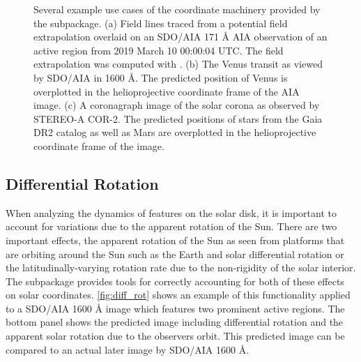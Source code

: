 \begin{figure}
    \caption{Several example use cases of the coordinate machinery provided by the  subpackage.
    (a) Field lines traced from a potential field extrapolation overlaid on an SDO/AIA 171 \AA{} AIA observation of an active region from 2019 March 10 00:00:04 UTC.
    The field extrapolation was computed with  \citep{david_stansby_2019_3237053}.
    (b) The Venus transit as viewed by SDO/AIA in 1600 \AA. The predicted position of Venus is overplotted in the helioprojective coordinate frame of the AIA image.
    (c) A coronagraph image of the solar corona as observed by STEREO-A COR-2. The predicted positions of stars from the Gaia DR2 catalog as well as Mars are overplotted in the helioprojective coordinate frame of the image.}
    \label{fig:coordinates_examples}
\end{figure}

\subsection{Differential Rotation}
\label{sec:differential_rotation}


When analyzing the dynamics of features on the solar disk, it is important to account for variations due to the apparent rotation of the Sun.
There are two important effects, the apparent rotation of the Sun as seen from platforms that are orbiting around the Sun such as the Earth and solar differential rotation or the latitudinally-varying rotation rate due to the non-rigidity of the solar interior.
The  subpackage provides tools for correctly accounting for both of these effects on solar coordinates. 
\autoref{fig:diff_rot} shows an example of this functionality applied to a SDO/AIA 1600 \AA{} image which features two prominent active regions. The bottom panel shows the predicted image including differential rotation and the apparent solar rotation due to the observers orbit. This predicted image can be compared to an actual later image by SDO/AIA 1600 \AA{}.

